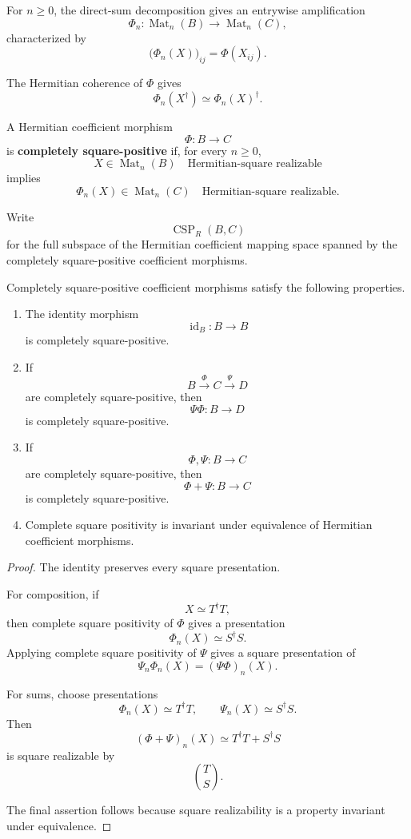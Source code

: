 For \(n\geq0\), the direct-sum decomposition gives an entrywise amplification
\[
  \Phi_n:
  \operatorname{Mat}_n(B)
  \longrightarrow
  \operatorname{Mat}_n(C),
\]
characterized by
\[
  \bigl(\Phi_n(X)\bigr)_{ij}
  =
  \Phi(X_{ij}).
\]

The Hermitian coherence of \(\Phi\) gives
\[
  \Phi_n(X^\dagger)
  \simeq
  \Phi_n(X)^\dagger.
\]

\begin{definition}
\label{def:higher-completely-square-positive}
A Hermitian coefficient morphism
\[
  \Phi:B\to C
\]
is \textbf{completely square-positive} if, for every \(n\geq0\),
\[
  X\in\operatorname{Mat}_n(B)
  \quad\text{Hermitian-square realizable}
\]
implies
\[
  \Phi_n(X)
  \in
  \operatorname{Mat}_n(C)
  \quad\text{Hermitian-square realizable}.
\]

Write
\[
  \operatorname{CSP}_R(B,C)
\]
for the full subspace of the Hermitian coefficient mapping space spanned by
the completely square-positive coefficient morphisms.
\end{definition}

\begin{proposition}
\label{prop:higher-csp-closure}
Completely square-positive coefficient morphisms satisfy the following
properties.

\begin{enumerate}
  \item The identity morphism
  \[
    \operatorname{id}_B:B\to B
  \]
  is completely square-positive.

  \item If
  \[
    B\xrightarrow{\Phi}C\xrightarrow{\Psi}D
  \]
  are completely square-positive, then
  \[
    \Psi\Phi:B\to D
  \]
  is completely square-positive.

  \item If
  \[
    \Phi,\Psi:B\to C
  \]
  are completely square-positive, then
  \[
    \Phi+\Psi:B\to C
  \]
  is completely square-positive.

  \item Complete square positivity is invariant under equivalence of
  Hermitian coefficient morphisms.
\end{enumerate}
\end{proposition}

\begin{proof}
The identity preserves every square presentation.

For composition, if
\[
  X\simeq T^\dagger T,
\]
then complete square positivity of \(\Phi\) gives a presentation
\[
  \Phi_n(X)\simeq S^\dagger S.
\]
Applying complete square positivity of \(\Psi\) gives a square presentation of
\[
  \Psi_n\Phi_n(X)
  =
  (\Psi\Phi)_n(X).
\]

For sums, choose presentations
\[
  \Phi_n(X)\simeq T^\dagger T,
  \qquad
  \Psi_n(X)\simeq S^\dagger S.
\]
Then
\[
  (\Phi+\Psi)_n(X)
  \simeq
  T^\dagger T+S^\dagger S
\]
is square realizable by
\[
  \binom{T}{S}.
\]

The final assertion follows because square realizability is a property
invariant under equivalence.
\end{proof}

